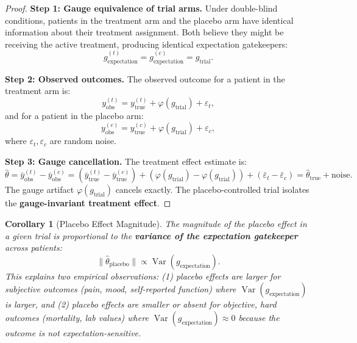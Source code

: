 \documentclass[12pt,a4paper]{article}
\newtheorem{corollary}[theorem]{Corollary}
\theoremstyle{remark}
\DeclareMathOperator{\Var}{Var}
\begin{document}
\begin{proof}
\noindent\textbf{Step 1: Gauge equivalence of trial arms.}
Under double-blind conditions, patients in the treatment arm and the placebo
arm have identical information about their treatment assignment. Both
believe they might be receiving the active treatment, producing identical
expectation gatekeepers:
\begin{equation}
  g_{\text{expectation}}^{(t)} = g_{\text{expectation}}^{(c)} = g_{\text{trial}}.
\end{equation}

\smallskip
\noindent\textbf{Step 2: Observed outcomes.}
The observed outcome for a patient in the treatment arm is:
\begin{equation}
  y_{\text{obs}}^{(t)} = y_{\text{true}}^{(t)} + \varphi(g_{\text{trial}}) +
  \varepsilon_t,
\end{equation}
and for a patient in the placebo arm:
\begin{equation}
  y_{\text{obs}}^{(c)} = y_{\text{true}}^{(c)} + \varphi(g_{\text{trial}}) +
  \varepsilon_c,
\end{equation}
where $\varepsilon_t, \varepsilon_c$ are random noise.

\smallskip
\noindent\textbf{Step 3: Gauge cancellation.}
The treatment effect estimate is:
\begin{equation}
  \hat{\theta} = \bar{y}_{\text{obs}}^{(t)} - \bar{y}_{\text{obs}}^{(c)}
  = (\bar{y}_{\text{true}}^{(t)} - \bar{y}_{\text{true}}^{(c)}) +
  (\varphi(g_{\text{trial}}) - \varphi(g_{\text{trial}})) +
  (\bar{\varepsilon}_t - \bar{\varepsilon}_c)
  = \hat{\theta}_{\text{true}} + \text{noise}.
\end{equation}
The gauge artifact $\varphi(g_{\text{trial}})$ cancels exactly. The
placebo-controlled trial isolates the \textbf{gauge-invariant treatment
effect}.
\end{proof}

\begin{corollary}[Placebo Effect Magnitude]
\label{cor:placebo_magnitude}
The magnitude of the placebo effect in a given trial is proportional to
the \textbf{variance of the expectation gatekeeper} across patients:
\begin{equation}
  \|\hat{\theta}_{\text{placebo}}\| \propto \Var(g_{\text{expectation}}).
\end{equation}
This explains two empirical observations: (1) placebo effects are larger
for subjective outcomes (pain, mood, self-reported function) where
$\Var(g_{\text{expectation}})$ is larger, and (2) placebo effects are
smaller or absent for objective, hard outcomes (mortality, lab values)
where $\Var(g_{\text{expectation}}) \approx 0$ because the outcome is
not expectation-sensitive.
\end{corollary}
\end{document}

